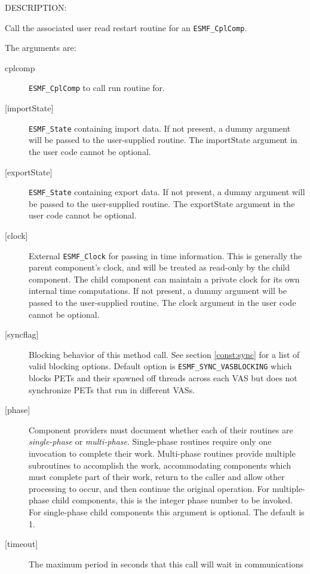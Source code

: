 {\sf DESCRIPTION:\\ }


   Call the associated user read restart routine for
   an {\tt ESMF\_CplComp}.
  
   The arguments are:
   \begin{description}
   \item[cplcomp]
     {\tt ESMF\_CplComp} to call run routine for.
   \item[{[importState]}]
     {\tt ESMF\_State} containing import data. If not present, a dummy
     argument will be passed to the user-supplied routine.  The
     importState argument in the user code cannot be optional.
   \item[{[exportState]}]
     {\tt ESMF\_State} containing export data. If not present, a dummy
     argument will be passed to the user-supplied routine.  The
     exportState argument in the user code cannot be optional.
   \item[{[clock]}]
     External {\tt ESMF\_Clock} for passing in time information.
     This is generally the parent component's clock, and will be treated
     as read-only by the child component.  The child component can maintain
     a private clock for its own internal time computations. If not present, a dummy
     argument will be passed to the user-supplied routine.  The
     clock argument in the user code cannot be optional.
   \item[{[syncflag]}]
     Blocking behavior of this method call. See section \ref{const:sync}
     for a list of valid blocking options. Default option is
     {\tt ESMF\_SYNC\_VASBLOCKING} which blocks PETs and their spawned off threads
     across each VAS but does not synchronize PETs that run in different VASs.
   \item[{[phase]}]
     Component providers must document whether each of their
     routines are {\em single-phase} or {\em multi-phase}.
     Single-phase routines require only one invocation to complete
     their work.
     Multi-phase routines provide multiple subroutines to accomplish
     the work, accommodating components which must complete part of their
     work, return to the caller and allow other processing to occur,
     and then continue the original operation.
     For multiple-phase child components, this is the integer phase
     number to be invoked.
     For single-phase child components this argument is optional. The default is
     1.
   \item[{[timeout]}]
     The maximum period in seconds that this call will wait in communications

\end{description}
